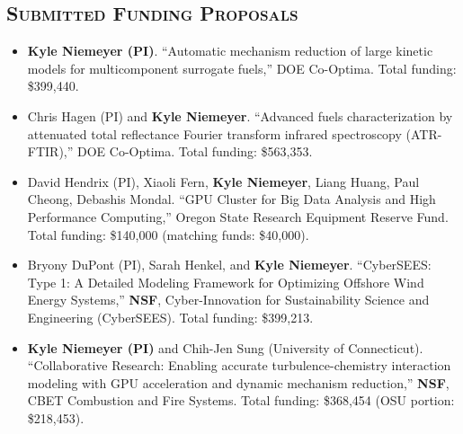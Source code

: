 \documentclass[margin,line,11pt]{res}
\begin{document}
\begin{resume}
%

\section{\textsc{Submitted Funding Proposals}}

\begin{itemize}[leftmargin=*]

\item \textbf{Kyle Niemeyer (PI)}.
``Automatic mechanism reduction of large kinetic models for multicomponent surrogate fuels,''
DOE Co-Optima.
Total funding: \$399,440.

\item Chris Hagen (PI) and \textbf{Kyle Niemeyer}.
``Advanced fuels characterization by attenuated total reflectance Fourier transform infrared spectroscopy (ATR-FTIR),''
DOE Co-Optima.
Total funding: \$563,353.

\item David Hendrix (PI), Xiaoli Fern, \textbf{Kyle Niemeyer}, Liang Huang, Paul Cheong, Debashis Mondal.
``GPU Cluster for Big Data Analysis and High Performance Computing,''
Oregon State Research Equipment Reserve Fund.
Total funding: \$140,000 (matching funds: \$40,000).

\item Bryony DuPont (PI), Sarah Henkel, and \textbf{Kyle Niemeyer}.
``CyberSEES: Type 1: A Detailed Modeling Framework for Optimizing Offshore Wind Energy Systems,''
\textbf{NSF}, Cyber-Innovation for Sustainability Science and Engineering (CyberSEES).
Total funding: \$399,213.

\item \textbf{Kyle Niemeyer (PI)} and Chih-Jen Sung (University of Connecticut).
``Collaborative Research: Enabling accurate turbulence-chemistry interaction modeling with GPU acceleration and dynamic mechanism reduction,''
\textbf{NSF}, CBET Combustion and Fire Systems.
Total funding: \$368,454 (OSU portion: \$218,453).


\end{itemize}
\end{resume}
\end{document}
